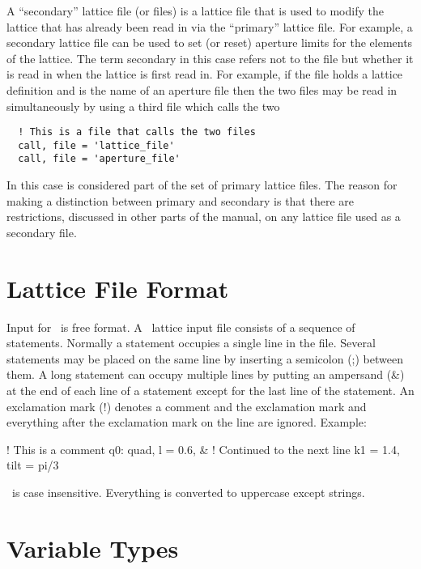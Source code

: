 A ``secondary'' lattice file (or files) is a lattice file that is used to modify
the lattice that has already been read in via the ``primary'' lattice
file.  For example, a secondary lattice file can be used to set (or
reset) aperture limits for the elements of the lattice.  The term
secondary in this case refers not to the file but whether it is read
in when the lattice is first read in. For example, if the file
 holds a lattice definition and  is
the name of an aperture file then the two files may be read in simultaneously
by using a third file which calls the two
\begin{verbatim}
  ! This is a file that calls the two files
  call, file = 'lattice_file'
  call, file = 'aperture_file'
\end{verbatim}
In this case  is considered part of the set of
primary lattice files.  The reason for making a distinction between
primary and secondary is that there are restrictions, discussed in
other parts of the manual, on any lattice file used as a secondary
file.


\section{Lattice File Format}

Input for \bmad\ is free format. A \bmad\ lattice input file consists
of a sequence of statements. Normally a statement occupies a single
line in the file. Several statements may be placed on the same line by
inserting a semicolon (;) between them. A long statement can occupy
multiple lines by putting an ampersand (\&) at the end of each line of
a statement except for the last line of the statement. An
exclamation mark (!) denotes a comment and the exclamation mark and
everything after the exclamation mark on the line are ignored. Example:
\begin{example}
  ! This is a comment
  q0: quad, l = 0.6, &     ! Continued to the next line
            k1 = 1.4, tilt = pi/3
\end{example}
\bmad\ is case insensitive. Everything is converted to uppercase except
strings.

\section{Variable Types}

